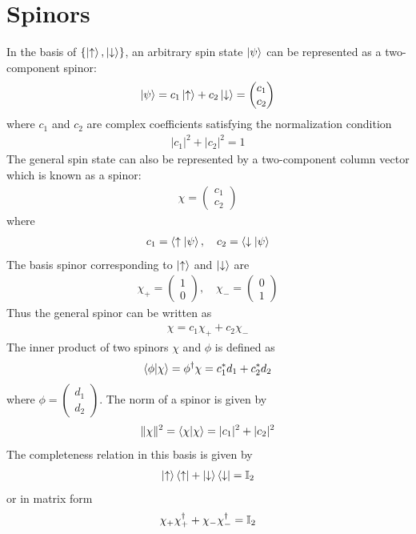 \section{Spinors}
In the basis of $\{\ket{\uparrow}, \ket{\downarrow}\}$, an arbitrary spin state $\ket{\psi}$ can be represented as a two-component spinor:
\begin{align}
    \ket{\psi} = c_1 \ket{\uparrow} + c_2 \ket{\downarrow} = \begin{pmatrix} c_1 \\ c_2 \end{pmatrix}
\end{align}
where $c_1$ and $c_2$ are complex coefficients satisfying the normalization condition
\begin{align}
    |c_1|^2 + |c_2|^2 = 1
\end{align}
The general spin state can also be represented by a two-component column vector which is known as a spinor: 
\begin{align}
    \chi = \begin{pmatrix} c_1 \\ c_2 \end{pmatrix}
\end{align}
where 
\begin{align}
    c_1 = \braket{\uparrow|\psi}, \quad c_2 = \braket{\downarrow|\psi}
\end{align}
The basis spinor corresponding to $\ket{\uparrow}$ and $\ket{\downarrow}$ are
\begin{align}
    \chi_+ = \begin{pmatrix} 1 \\ 0 \end{pmatrix}, \quad \chi_- = \begin{pmatrix} 0 \\ 1 \end{pmatrix}
\end{align}
Thus the general spinor can be written as
\begin{align}
    \chi = c_1 \chi_+ + c_2 \chi_-
\end{align}
The inner product of two spinors $\chi$ and $\phi$ is defined as
\begin{align}
    \braket{\phi|\chi} = \phi^\dag \chi = c_1^* d_1 + c_2^* d_2
\end{align}
where $\phi = \begin{pmatrix} d_1 \\ d_2 \end{pmatrix}$. The norm of a spinor is given by
\begin{align}
    \|\chi\|^2 = \braket{\chi|\chi} = |c_1|^2 + |c_2|^2
\end{align}
The completeness relation in this basis is given by 
\begin{align}
    \ket{\uparrow} \bra{\uparrow} + \ket{\downarrow} \bra{\downarrow} = \mathbb{I}_2
\end{align}
or in matrix form 
\begin{align}
    \chi_+ \chi_+^\dag + \chi_- \chi_-^\dag = \mathbb{I}_2
\end{align}

